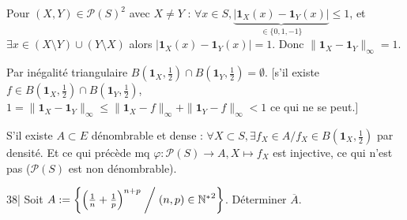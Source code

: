 \begin{solution}
Pour $(X, Y) \in \mathcal{P}(S)^2$ avec $X \neq Y$ : $\forall x \in S, \underbrace{|\mathbf{1}_X(x) - \mathbf{1}_Y(x)|}_{\in \{0, 1, -1\}} \leq 1$, et $\exists x \in (X \setminus Y) \cup (Y \setminus X)$ alors $|\mathbf{1}_X(x) - \mathbf{1}_Y(x)| = 1$. Donc $\|\mathbf{1}_X - \mathbf{1}_Y\|_\infty = 1$.

Par inégalité triangulaire $B\left(\mathbf{1}_X, \frac{1}{2}\right) \cap B\left(\mathbf{1}_Y, \frac{1}{2}\right) = \emptyset$.
$\big[$s'il existe $f \in B\left(\mathbf{1}_X, \frac{1}{2}\right) \cap B\left(\mathbf{1}_Y, \frac{1}{2}\right)$, $1 = \|\mathbf{1}_X - \mathbf{1}_Y\|_\infty \leq \|\mathbf{1}_X - f\|_\infty + \|\mathbf{1}_Y - f\|_\infty < 1$ ce qui ne se peut.$\big]$

S'il existe $A \subset E$ dénombrable et dense :
$\forall X \subset S, \exists f_X \in A / f_X \in B\left(\mathbf{1}_X, \frac{1}{2}\right)$ par densité.
Et ce qui précède mq $\varphi : \mathcal{P}(S) \to A, X \mapsto f_X$ est injective, ce qui n'est pas ($\mathcal{P}(S)$ est non dénombrable).
\end{solution}


\begin{statementbox}
38| Soit $A := \left\{ \left(\frac{1}{n} + \frac{1}{p}\right)^{n+p} \;\middle/\; (n, p) \in {\mathbb N^*}^2 \right\}$. Déterminer $\overline{A}$.
\end{statementbox}

